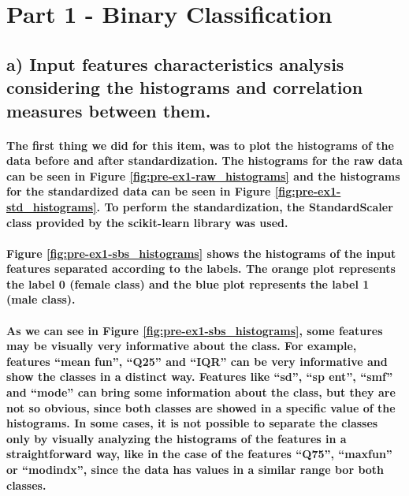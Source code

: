 \documentclass[a4paper]{article}    %
\begin{document}
\bigskip

\section{Part 1 - Binary Classification}

\subsection{a) Input features characteristics analysis considering the histograms and correlation measures between them.}

\paragraph{The first thing we did for this item, was to plot the histograms of the data before and after standardization. The histograms for the raw data can be seen in Figure \ref{fig:pre-ex1-raw_histograms} and the histograms for the standardized data can be seen in Figure \ref{fig:pre-ex1-std_histograms}. To perform the standardization, the StandardScaler class provided by the scikit-learn library was used.}

\paragraph{Figure \ref{fig:pre-ex1-sbs_histograms} shows the histograms of the input features separated according to the labels. The orange plot represents the label 0 (female class) and the blue plot represents the label 1 (male class).}

\paragraph{As we can see in Figure \ref{fig:pre-ex1-sbs_histograms}, some features may be visually very informative about the class. For example, features ``mean fun'', ``Q25''  and ``IQR'' can be very informative and show the classes in a distinct way. Features like ``sd'', ``sp ent'', ``smf'' and ``mode'' can bring some information about the class, but they are not so obvious, since both classes are showed in a specific value of the histograms. In some cases, it is not possible to separate the classes only by visually analyzing the histograms of the features in a straightforward way, like in the case of the features ``Q75'', ``maxfun'' or ``modindx'', since the data has values in a similar range bor both classes.}
\end{document}
